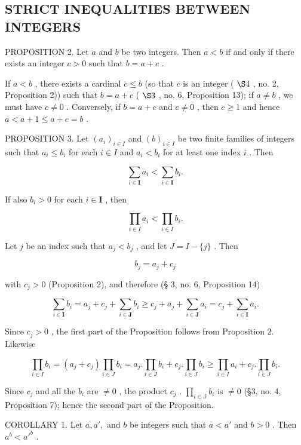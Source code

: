 \subsection{STRICT INEQUALITIES BETWEEN INTEGERS}

PROPOSITION 2. Let \(a\) and \(b\) be two integers. Then \(a < b\) if and only if there exists an integer \(c > 0\) such that \(b = a + c\) .

If \(a < b\) , there exists a cardinal \(c \leqslant b\) (so that \(c\) is an integer ( \(\S 4\) , no. 2, Proposition 2)) such that \(b = a + c\) ( \(\S 3\) , no. 6, Proposition 13); if \(a \neq b\) , we must have \(c \neq 0\) . Conversely, if \(b = a + c\) and \(c \neq 0\) , then \(c \geqslant 1\) and hence \(a < a + 1 \leqslant a + c = b\) .

PROPOSITION 3. Let \((a_i)_{i \in I}\) and \((b)_{i \in I}\) be two finite families of integers such that \(a_i \leqslant b_i\) for each \(i \in I\) and \(a_i < b_i\) for at least one index \(i\) . Then

\[
\sum_ {i \in \mathbf {I}} a _ {i} <   \sum_ {i \in \mathbf {I}} b _ {i}.
\]

If also \(b_{i} > 0\) for each \(i \in \mathbf{I}\) , then

\[
\prod_ {i \in I} a _ {i} <   \prod_ {i \in I} b _ {i}.
\]

Let \(j\) be an index such that \(a_{j} < b_{j}\) , and let \(J = I - \{j\}\) . Then

\[
b _ {j} = a _ {j} + c _ {j}
\]

with \(c_{j} > 0\) (Proposition 2), and therefore (§ 3, no. 6, Proposition 14)

\[
\sum_ {i \in \mathbf {I}} b _ {i} = a _ {j} + c _ {j} + \sum_ {i \in \mathbf {J}} b _ {i} \geqslant c _ {j} + a _ {j} + \sum_ {i \in \mathbf {J}} a _ {i} = c _ {j} + \sum_ {i \in \mathbf {I}} a _ {i}.
\]

Since \(c_{j} > 0\) , the first part of the Proposition follows from Proposition 2. Likewise

\[
\prod_ {i \in I} b _ {i} = (a _ {j} + c _ {j}) \prod_ {i \in J} b _ {i} = a _ {j}. \prod_ {i \in J} b _ {i} + c _ {j}. \prod_ {i \in J} b _ {i} \geqslant \prod_ {i \in I} a _ {i} + c _ {j}. \prod_ {i \in J} b _ {i}.
\]

Since \(c_{j}\) and all the \(b_{i}\) are \(\neq 0\) , the product \(c_{j}\) . \(\prod_{i \in \mathbb{J}} b_{i}\) is \(\neq 0\) (§3, no. 4, Proposition 7); hence the second part of the Proposition.

COROLLARY 1. Let \(a, a',\) and \(b\) be integers such that \(a < a'\) and \(b > 0\) . Then \(a^b < a'^b\) .

